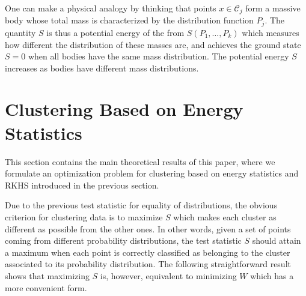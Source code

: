 \documentclass[aps,preprint,nofootinbib,floatfix]{revtex4-1}
\newcommand\C{{\mathcal{C}}}
\begin{document}
One can make a physical analogy by thinking 
that points $ x \in \C_j$ form a massive body 
whose total mass is characterized by the distribution function $P_j$.
The quantity $S$ is thus a potential
energy of the from $S(P_1,\dotsc,P_k)$ which measures how different
the distribution of these masses are,  and achieves the ground state
$S=0$ when all bodies have the same mass distribution. The potential energy
$S$ increases as bodies have different mass distributions.


\section{Clustering Based on Energy Statistics}
\label{sec:clustering_theory}

This section contains the main theoretical results of this paper, where 
we formulate an optimization problem for clustering 
based on energy statistics and RKHS introduced in the previous section.

Due to the previous test statistic for equality of distributions,
the obvious
criterion for clustering data is to 
maximize $S$ which makes 
each cluster as different
as possible from the other ones.
In other words, given a set of points coming from different probability
distributions, the test statistic $S$ should attain a maximum when 
each point is correctly
classified as belonging to the cluster associated to its probability
distribution.
The following 
straightforward result
shows that maximizing $S$ is, however, equivalent to minimizing
$W$ which has a more convenient form.
\end{document}
